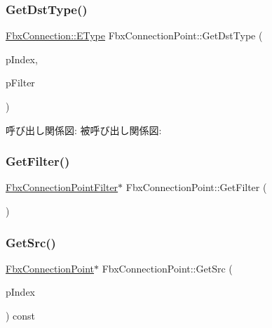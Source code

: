 \mbox{\label{class_fbx_connection_point_a5319469d7eaadf57f569a91218620ba9}} 
\subsubsection{\texorpdfstring{Get\+Dst\+Type()}{GetDstType()}\hspace{0.1cm}{\footnotesize\ttfamily [2/2]}}
{\footnotesize\ttfamily \hyperlink{class_fbx_connection_a3df448a5db356652ab99fd2be2553749}{Fbx\+Connection\+::\+E\+Type} Fbx\+Connection\+Point\+::\+Get\+Dst\+Type (\begin{DoxyParamCaption}\item[{int}]{p\+Index,  }\item[{\hyperlink{class_fbx_connection_point_filter}{Fbx\+Connection\+Point\+Filter} $\ast$}]{p\+Filter }\end{DoxyParamCaption})}

呼び出し関係図\+:
被呼び出し関係図\+:
\mbox{\label{class_fbx_connection_point_aff0a1b385e12c2f785efd545d595709a}} 
\subsubsection{\texorpdfstring{Get\+Filter()}{GetFilter()}}
{\footnotesize\ttfamily \hyperlink{class_fbx_connection_point_filter}{Fbx\+Connection\+Point\+Filter}$\ast$ Fbx\+Connection\+Point\+::\+Get\+Filter (\begin{DoxyParamCaption}{ }\end{DoxyParamCaption})}

\mbox{\label{class_fbx_connection_point_a87dcd2781e9860479e780c807f7e9b2b}} 
\subsubsection{\texorpdfstring{Get\+Src()}{GetSrc()}\hspace{0.1cm}{\footnotesize\ttfamily [1/2]}}
{\footnotesize\ttfamily \hyperlink{class_fbx_connection_point}{Fbx\+Connection\+Point}$\ast$ Fbx\+Connection\+Point\+::\+Get\+Src (\begin{DoxyParamCaption}\item[{int}]{p\+Index }\end{DoxyParamCaption}) const}

